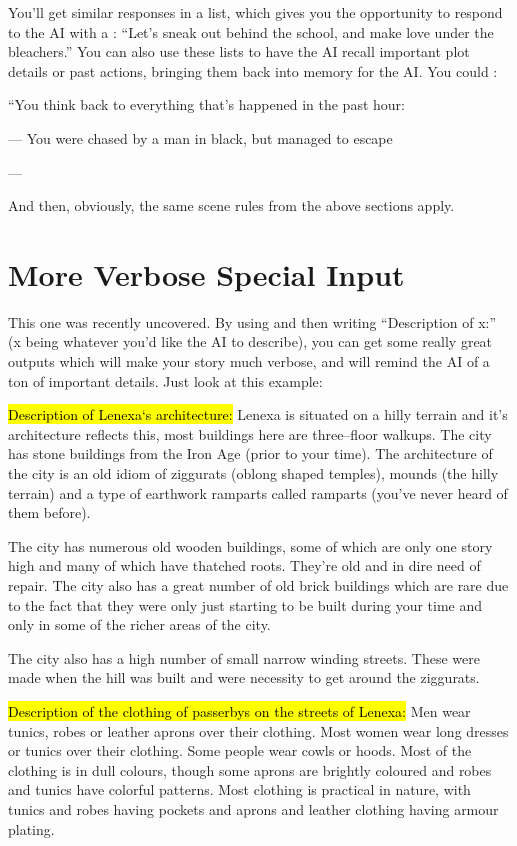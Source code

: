 \documentclass[Avsfag-main.tex]{subfiles}
\begin{document}
You'll get similar responses in a list, which gives you the opportunity to respond to the AI with a \say: ``Let's sneak out behind the school, and make love under the bleachers.''
You can also use these lists to have the AI recall important plot details or past actions, bringing them back into memory for the AI.
You could \say:

\begin{storyb}
``You think back to everything that's happened in the past hour:

— You were chased by a man in black, but managed to escape

—
\end{storyb}

And then, obviously, the same scene rules from the above sections apply.

\section{More Verbose Special Input}

This one was recently uncovered.
By using \story and then writing ``Description of x:'' (x being whatever you'd like the AI to describe), you can get some really great outputs which will make your story much verbose, and will remind the AI of a ton of important details.
Just look at this example:

\begin{storyb}
	\hl{Description of Lenexa‘s architecture:} Lenexa is situated on a hilly terrain and it's architecture reflects this, most buildings here are three--floor walkups.
The city has stone buildings from the Iron Age (prior to your time).
The architecture of the city is an old idiom of ziggurats (oblong shaped temples), mounds (the hilly terrain) and a type of earthwork ramparts called ramparts (you've never heard of them before).

The city has numerous old wooden buildings, some of which are only one story high and many of which have thatched roots.
They're old and in dire need of repair.
The city also has a great number of old brick buildings which are rare due to the fact that they were only just starting to be built during your time and only in some of the richer areas of the city.

The city also has a high number of small narrow winding streets.
These were made when the hill was built and were necessity to get around the ziggurats.

\hl{Description of the clothing of passerbys on the streets of Lenexa:} Men wear tunics, robes or leather aprons over their clothing.
Most women wear long dresses or tunics over their clothing.
Some people wear cowls or hoods.
Most of the clothing is in dull colours, though some aprons are brightly coloured and robes and tunics have colorful patterns.
Most clothing is practical in nature, with tunics and robes having pockets and aprons and leather clothing having armour plating.
\end{storyb}
\end{document}
